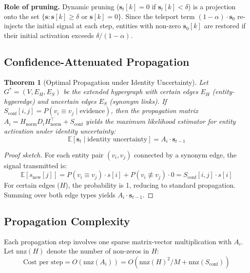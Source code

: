 \documentclass[11pt,a4paper]{article}
\newtheorem{theorem}{Theorem}
\begin{document}
\textbf{Role of pruning.} Dynamic pruning ($\mathbf{s}_t[k] = 0$ if $\mathbf{s}_t[k] < \delta$) is a projection onto the set $\{\mathbf{s} : \mathbf{s}[k] \geq \delta \text{ or } \mathbf{s}[k] = 0\}$. Since the teleport term $(1-\alpha) \cdot \mathbf{s}_0$ re-injects the initial signal at each step, entities with non-zero $\mathbf{s}_0[k]$ are restored if their initial activation exceeds $\delta / (1 - \alpha)$.

\subsection{Confidence-Attenuated Propagation}

\begin{theorem}[Optimal Propagation under Identity Uncertainty]
Let $G^* = (V, E_H, E_S)$ be the extended hypergraph with certain edges $E_H$ (entity-hyperedge) and uncertain edges $E_S$ (synonym links). If $S_{\text{conf}}[i,j] = P(v_i \equiv v_j \mid \text{evidence})$, then the propagation matrix $A_i = H_{\text{norm}} D_i H_{\text{norm}}^\top + S_{\text{conf}}$ yields the maximum likelihood estimator for entity activation under identity uncertainty:
\begin{equation}
    \mathbb{E}[\mathbf{s}_t \mid \text{identity uncertainty}] = A_i \cdot \mathbf{s}_{t-1}
\end{equation}
\end{theorem}

\begin{proof}[Proof sketch]
For each entity pair $(v_i, v_j)$ connected by a synonym edge, the signal transmitted is:
\begin{equation}
    \mathbb{E}[s_{\text{new}}[j]] = P(v_i \equiv v_j) \cdot s[i] + P(v_i \not\equiv v_j) \cdot 0 = S_{\text{conf}}[i,j] \cdot s[i]
\end{equation}
For certain edges ($H$), the probability is 1, reducing to standard propagation. Summing over both edge types yields $A_i \cdot \mathbf{s}_{t-1}$.
\end{proof}

\subsection{Propagation Complexity}

Each propagation step involves one sparse matrix-vector multiplication with $A_i$. Let $\text{nnz}(H)$ denote the number of non-zeros in $H$:
\begin{equation}
    \text{Cost per step} = O(\text{nnz}(A_i)) = O(\text{nnz}(H)^2 / M + \text{nnz}(S_{\text{conf}}))
\end{equation}
\end{document}
